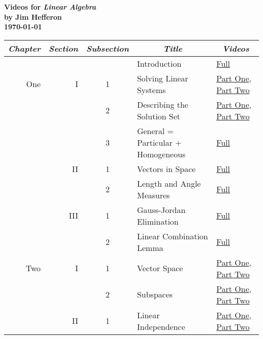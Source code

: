 \documentclass{article}
\begin{document}
\thispagestyle{empty}
\begin{center}
  \LARGE\textbf{Videos for \textit{Linear Algebra}} \\[1ex]
  \Large\textbf{by Jim Hef{}feron}\\[0.3ex]
  \Large\textbf{\today}\\
\end{center}
\vspace{3ex}
\begin{center}
\begin{tabular}{|rrc|ll|}
  \multicolumn{1}{c}{\textit{Chapter}} 
  &\multicolumn{1}{c}{\textit{Section}} 
  &\multicolumn{1}{c}{\textit{Subsection}} 
  &\multicolumn{1}{c}{\textit{Title}} 
  &\multicolumn{1}{c}{\textit{Videos}} 
  \\ \hline
      &    &  &Introduction          &\href{https://youtu.be/i-aS6VrDomg}{Full}   \\
 \hline
  One &I   &1 &Solving Linear Systems             &\href{https://youtu.be/4e6AsXVIsFc}{Part One}, \href{https://youtu.be/lhkdzfWfwp0}{Part Two}   \\
      &    &2 &Describing the Solution Set        &\href{https://youtu.be/ExVBc05YQPg}{Part One}, \href{https://youtu.be/ZatFu5GVFbo}{Part Two}   \\
      &    &3 &General = Particular + Homogeneous &\href{https://youtu.be/OcayHebo62Q}{Full}   \\
      \cline{4-5}
      &II  &1  &Vectors in Space                  &\href{https://youtu.be/5UpMGlhtVf4}{Full}   \\
      &    &2  &Length and Angle Measures         &\href{https://youtu.be/-vzdOIP-a5A}{Full}   \\
      \cline{4-5}
      &III &1  &Gauss-Jordan Elimination            &\href{https://youtu.be/Q0UGClfdgCg}{Full}   \\
      &    &2  &Linear Combination Lemma          &\href{https://youtu.be/QTfFmEUhQlE}{Full}   \\
 \hline
 Two  &I   &1 &Vector Space                       &\href{https://youtu.be/LIGgeCkcr6A}{Part One}, \href{https://youtu.be/UU6FSncoWJs}{Part Two}   \\
      &    &2 &Subspaces                          &\href{https://youtu.be/SHh7sp3Tedc}{Part One}, \href{https://youtu.be/rea8WbXAVVY}{Part Two}   \\
      \cline{4-5}
      &II  &1 &Linear Independence                &\href{https://youtu.be/x27ccxIPndU}{Part One}, \href{https://youtu.be/i7tUZioOYLI}{Part Two}     \\

\end{tabular}
\end{center}
\end{document}

